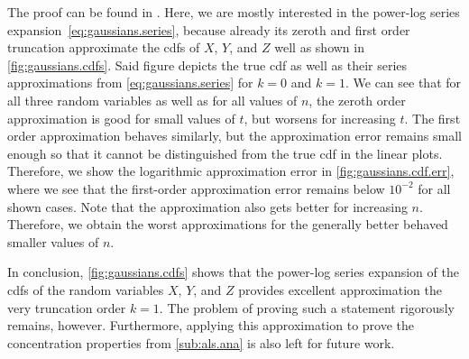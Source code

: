 The proof can be found in \cite{Stojanac_2017_On}.
Here, we are mostly interested in the power-log series expansion~\eqref{eq:gaussians.series}, because already its zeroth and first order truncation approximate the cdfs of $X$, $Y$, and $Z$ well as shown in \cref{fig:gaussians.cdfs}.
Said figure depicts the true cdf as well as their series approximations from \cref{eq:gaussians.series} for $k=0$ and $k=1$.
We can see that for all three random variables as well as for all values of $n$, the zeroth order approximation is good for small values of $t$, but worsens for increasing $t$.
The first order approximation behaves similarly, but the approximation error remains small enough so that it cannot be distinguished from the true cdf in the linear plots.
Therefore, we show the logarithmic approximation error in \cref{fig:gaussians.cdf.err}, where we see that the first-order approximation error remains below $10^{-2}$ for all shown cases.
Note that the approximation also gets better for increasing $n$.
Therefore, we obtain the worst approximations for the generally better behaved smaller values of $n$.

In conclusion, \cref{fig:gaussians.cdfs} shows that the power-log series expansion of the cdfs of the random variables $X$, $Y$, and $Z$ provides excellent approximation the very truncation order $k=1$.
The problem of proving such a statement rigorously remains, however.
Furthermore, applying this approximation to prove the concentration properties from \cref{sub:als.ana} is also left for future work.\\



